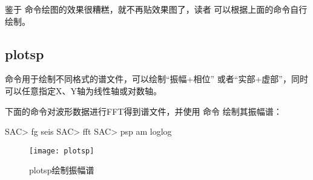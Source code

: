 鉴于  命令绘图的效果很糟糕，就不再贴效果图了，读者
可以根据上面的命令自行绘制。

\subsection{plotsp}
 命令用于绘制不同格式的谱文件，可以绘制``振幅+相位''
或者``实部+虚部''，同时可以任意指定X、Y轴为线性轴或对数轴。

下面的命令对波形数据进行FFT得到谱文件，并使用  命令
绘制其振幅谱：
\begin{SACCode}
SAC> fg seis
SAC> fft
SAC> psp am loglog
\end{SACCode}

\begin{figure}[H]
\centering
\texttt{[image: plotsp]}
\caption{plotsp绘制振幅谱}
\label{fig:plotsp}
\end{figure}

